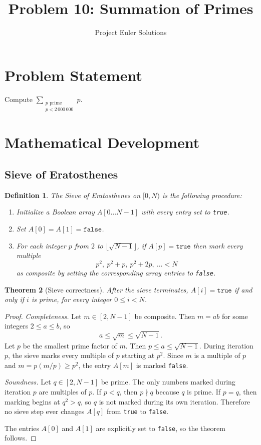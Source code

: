 \documentclass[11pt]{article}
\title{Problem 10: Summation of Primes}
\author{Project Euler Solutions}
\date{}
\newtheorem{theorem}{Theorem}
\newtheorem{definition}[theorem]{Definition}
\begin{document}
\maketitle

\section{Problem Statement}

Compute $\displaystyle\sum_{\substack{p \text{ prime} \\ p < 2\,000\,000}} p$.

\section{Mathematical Development}

\subsection{Sieve of Eratosthenes}

\begin{definition}
The \emph{Sieve of Eratosthenes} on $[0,N)$ is the following procedure:
\begin{enumerate}
\item Initialize a Boolean array $A[0 \ldots N-1]$ with every entry set to \texttt{true}.
\item Set $A[0] = A[1] = \texttt{false}$.
\item For each integer $p$ from $2$ to $\lfloor \sqrt{N-1} \rfloor$, if $A[p] = \texttt{true}$ then mark every multiple
\[
p^2,\ p^2+p,\ p^2+2p,\ \ldots < N
\]
as composite by setting the corresponding array entries to \texttt{false}.
\end{enumerate}
\end{definition}

\begin{theorem}[Sieve correctness]\label{thm:sieve}
After the sieve terminates, $A[i] = \texttt{true}$ if and only if $i$ is prime, for every integer $0 \le i < N$.
\end{theorem}

\begin{proof}
\emph{Completeness.} Let $m \in [2,N-1]$ be composite. Then $m = ab$ for some integers $2 \le a \le b$, so
\[
a \le \sqrt{m} \le \sqrt{N-1}.
\]
Let $p$ be the smallest prime factor of $m$. Then $p \le a \le \sqrt{N-1}$. During iteration $p$, the sieve marks every multiple of $p$ starting at $p^2$. Since $m$ is a multiple of $p$ and $m = p(m/p) \ge p^2$, the entry $A[m]$ is marked \texttt{false}.

\emph{Soundness.} Let $q \in [2,N-1]$ be prime. The only numbers marked during iteration $p$ are multiples of $p$. If $p < q$, then $p \nmid q$ because $q$ is prime. If $p = q$, then marking begins at $q^2 > q$, so $q$ is not marked during its own iteration. Therefore no sieve step ever changes $A[q]$ from \texttt{true} to \texttt{false}.

The entries $A[0]$ and $A[1]$ are explicitly set to \texttt{false}, so the theorem follows.
\end{proof}
\end{document}
